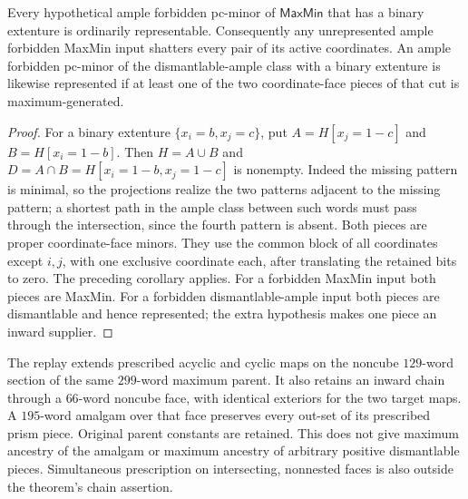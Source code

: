 \begin{corollary}
\label{cor:maxmin-binary-forbidden-representation}
Every hypothetical ample forbidden pc-minor of $\mathsf{MaxMin}$
that has a binary extenture is ordinarily representable. Consequently
any unrepresented ample forbidden MaxMin input shatters every pair of
its active coordinates.
An ample forbidden pc-minor of the dismantlable-ample class with a
binary extenture is likewise represented if at least one of the two
coordinate-face pieces of that cut is maximum-generated.
\end{corollary}
\begin{proof}
For a binary extenture $\{x_i=b,x_j=c\}$, put
$A=H[x_j=1-c]$ and $B=H[x_i=1-b]$. Then $H=A\cup B$ and
$D=A\cap B=H[x_i=1-b,x_j=1-c]$ is nonempty. Indeed the missing
pattern is minimal, so the projections realize the two patterns adjacent to the
missing pattern; a shortest path in the ample class between such
words must pass through the intersection, since the fourth pattern
is absent. Both pieces are proper coordinate-face minors.
They use the common block of all coordinates except $i,j$, with
one exclusive coordinate each, after translating the retained bits
to zero. The preceding corollary applies. For a forbidden MaxMin
input both pieces are MaxMin. For a forbidden dismantlable-ample
input both pieces are dismantlable and hence represented; the extra
hypothesis makes one piece an inward supplier.
\end{proof}

The replay extends prescribed acyclic and cyclic maps on the noncube
$129$-word section of the same $299$-word maximum parent. It also
retains an inward chain through a $66$-word noncube face, with identical
exteriors for the two target maps. A $195$-word amalgam over that face
preserves every out-set of its prescribed prism piece. Original parent
constants are retained. This does not give maximum ancestry of the
amalgam or maximum ancestry of arbitrary positive dismantlable pieces.
Simultaneous prescription on intersecting, nonnested faces is also
outside the theorem's chain assertion.
